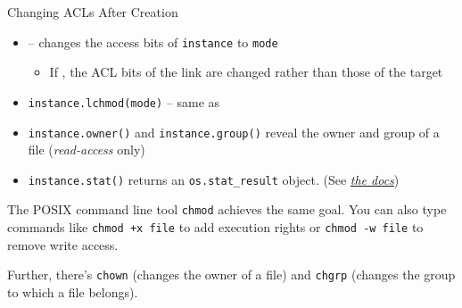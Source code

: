 \begin{frame}[fragile]{Changing ACLs After Creation}
%
\begin{itemize}
\item {} -- changes the access bits of \texttt{instance} to \texttt{mode}
	\begin{itemize}
	\item If , the ACL bits of the link are changed rather than those of the target
	\end{itemize}
\item \texttt{instance.lchmod(mode)} -- same as 
\item \texttt{instance.owner()} and \texttt{instance.group()} reveal the owner and group of a file (\emph{read-access} only)
\item \texttt{instance.stat()} returns an \texttt{os.stat\_result} object. 
	(See \href{https://docs.python.org/3/library/os.html#os.stat_result}{\thus \emph{the docs}})
\end{itemize}
%
\begin{hintbox}
\scriptsize
The POSIX command line tool \texttt{chmod} achieves the same goal. You can also type commands like \texttt{chmod +x file} to add execution rights or \texttt{chmod -w file} to remove write access.

\vspace{3pt}
Further, there's \texttt{chown} (changes the owner of a file) and \texttt{chgrp} (changes the group to which a file belongs).
\end{hintbox}
%
\end{frame}


